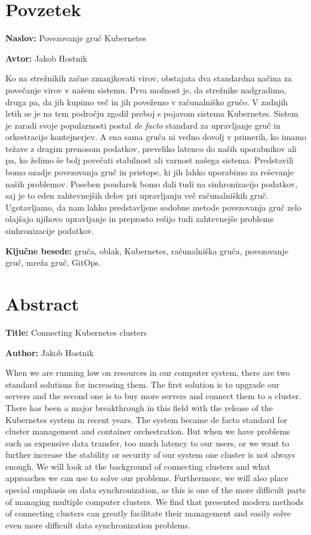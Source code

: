 \documentclass[a4paper, 12pt]{book}
\newcommand{\ttitle}{Povezovanje gruč Kubernetes}
\newcommand{\ttitleEn}{Connecting Kubernetes clusters}
\newcommand{\tauthor}{Jakob Hostnik}
\newcommand{\tkeywords}{gruča, oblak, Kubernetes, računalniška gruča, povezovanje gruč, mreža gruč, GitOps}
\newcommand{\clearemptydoublepage}{\newpage{\pagestyle{empty}\cleardoublepage}}
\begin{document}
\chapter*{Povzetek}
\noindent\textbf{Naslov:} \ttitle
\bigskip

\noindent\textbf{Avtor:} \tauthor
\bigskip
\noindent 

Ko na strežnikih začne zmanjkovati virov, obstajata dva standardna načina za povečanje virov v našem sistemu.
Prva možnost je, da strežnike nadgradimo, druga pa, da jih kupimo več in jih povežemo v računalniško gručo.
V zadnjih letih se je na tem področju zgodil preboj s pojavom sistema Kubernetes.
Sistem je zaradi svoje popularnosti postal \emph{de facto} standard za upravljanje gruč in orkestracijo kontejnerjev.
A ena sama gruča ni vedno dovolj v primerih, ko imamo težave z dragim prenosom podatkov, preveliko latenco do naših uporabnikov ali pa, ko želimo še bolj povečati stabilnost ali varnost našega sistema.
Predstavili bomo ozadje povezovanja gruč in pristope, ki jih lahko uporabimo za reševanje naših problemov.
Poseben poudarek bomo dali tudi na sinhronizacijo podatkov, saj je to eden zahtevnejših delov pri upravljanju več računalniških gruč.
Ugotavljamo, da nam lahko predstavljene sodobne metode povezovanja gruč zelo olajšajo njihovo upravljanje in preprosto rešijo tudi zahtevnejše probleme sinhronizacije podatkov.

\bigskip
\noindent\textbf{Ključne besede:} \tkeywords.
\clearemptydoublepage
\chapter*{Abstract}
\noindent\textbf{Title:} \ttitleEn
\bigskip

\noindent\textbf{Author:} \tauthor
\bigskip
\noindent 

When we are running low on resources in our computer system, there are two standard solutions for increasing them.
The first solution is to upgrade our servers and the second one is to buy more servers and connect them to a cluster.
There has been a major breakthrough in this field with the release of the Kubernetes system in recent years.
The system became de facto standard for cluster management and container orchestration.
But when we have problems such as expensive data transfer, too much latency to our users, or we want to further increase the stability or security of our system one cluster is not always enough.
We will look at the background of connecting clusters and what approaches we can use to solve our problems.
Furthermore, we will also place special emphasis on data synchronization, as this is one of the more difficult parts of managing multiple computer clusters.
We find that presented modern methods of connecting clusters can greatly facilitate their management and easily solve even more difficult data synchronization problems.
\end{document}
